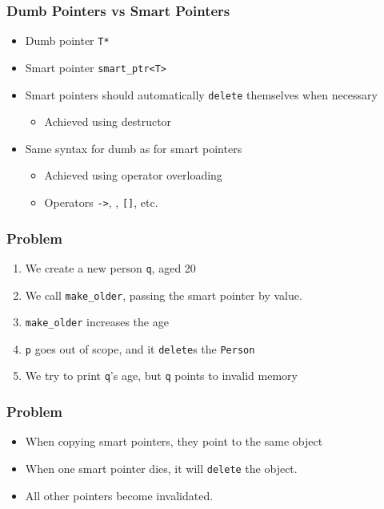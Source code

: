 \begin{frame}
  \frametitle{Dumb Pointers vs Smart Pointers}
  \begin{itemize}
    \item Dumb pointer {\tt T*}
    \item Smart pointer {\tt smart\_ptr<T>}
    \item Smart pointers should automatically {\tt delete} themselves when necessary
          \begin{itemize}
            \item Achieved using destructor
          \end{itemize}
    \item Same syntax for dumb as for smart pointers
          \begin{itemize}
            \item Achieved using operator overloading
            \item Operators {\tt ->}, {\tt *}, {\tt []}, etc.
          \end{itemize}
  \end{itemize}
\end{frame}

\begin{frame}
  \frametitle{Problem}
  \begin{enumerate}
    \item We create a new person {\tt q}, aged 20
    \item We call {\tt make\_older}, passing the smart pointer by value.
    \item {\tt make\_older} increases the age
    \item {\tt p} goes out of scope, and it {\tt delete}s the {\tt Person}
    \item We try to print {\tt q}'s age, but {\tt q} points to invalid memory
  \end{enumerate}
\end{frame}

\begin{frame}
  \frametitle{Problem}
  \begin{center}
  \end{center}
  \begin{itemize}
    \item When copying smart pointers, they point to the same object
    \item When one smart pointer dies, it will {\tt delete} the object.
    \item All other pointers become invalidated.      
  \end{itemize}
\end{frame}

